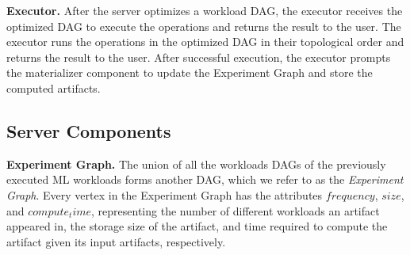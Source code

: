 \textbf{Executor. }
After the server optimizes a workload DAG, the executor receives the optimized DAG to execute the operations and returns the result to the user.
The executor runs the operations in the optimized DAG in their topological order and returns the result to the user.
After successful execution, the executor prompts the materializer component to update the Experiment Graph and store the computed artifacts.

%

\subsection{Server Components}
\textbf{Experiment Graph.}
The union of all the workloads DAGs of the previously executed ML workloads forms another DAG, which we refer to as the \textit{Experiment Graph}.
Every vertex in the Experiment Graph has the attributes $frequency$, $size$, and $compute_time$, representing the number of different workloads an artifact appeared in, the storage size of the artifact, and time required to compute the artifact given its input artifacts, respectively.


